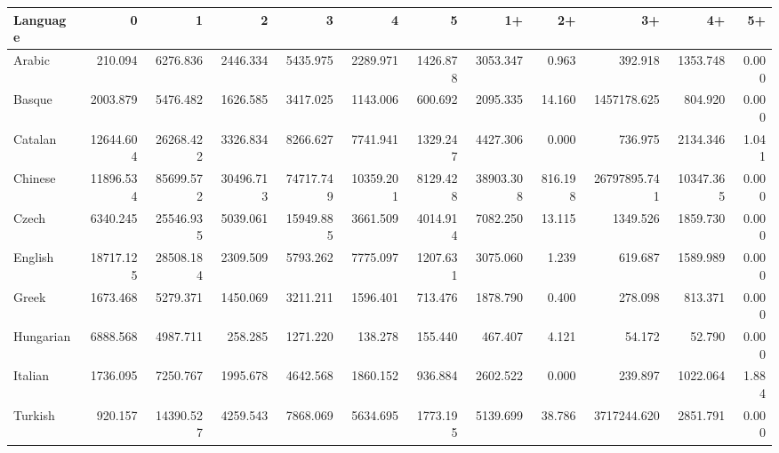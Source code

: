 \begin{tabular}{lrrrrrrrrrrr}
\toprule
 Language   &         0 &         1 &         2 &         3 &         4 &        5 &        1+ &      2+ &           3+ &        4+ &    5+ \\
\midrule
 Arabic     &   210.094 &  6276.836 &  2446.334 &  5435.975 &  2289.971 & 1426.878 &  3053.347 &   0.963 &      392.918 &  1353.748 & 0.000 \\
 Basque     &  2003.879 &  5476.482 &  1626.585 &  3417.025 &  1143.006 &  600.692 &  2095.335 &  14.160 &  1457178.625 &   804.920 & 0.000 \\
 Catalan    & 12644.604 & 26268.422 &  3326.834 &  8266.627 &  7741.941 & 1329.247 &  4427.306 &   0.000 &      736.975 &  2134.346 & 1.041 \\
 Chinese    & 11896.534 & 85699.572 & 30496.713 & 74717.749 & 10359.201 & 8129.428 & 38903.308 & 816.198 & 26797895.741 & 10347.365 & 0.000 \\
 Czech      &  6340.245 & 25546.935 &  5039.061 & 15949.885 &  3661.509 & 4014.914 &  7082.250 &  13.115 &     1349.526 &  1859.730 & 0.000 \\
 English    & 18717.125 & 28508.184 &  2309.509 &  5793.262 &  7775.097 & 1207.631 &  3075.060 &   1.239 &      619.687 &  1589.989 & 0.000 \\
 Greek      &  1673.468 &  5279.371 &  1450.069 &  3211.211 &  1596.401 &  713.476 &  1878.790 &   0.400 &      278.098 &   813.371 & 0.000 \\
 Hungarian  &  6888.568 &  4987.711 &   258.285 &  1271.220 &   138.278 &  155.440 &   467.407 &   4.121 &       54.172 &    52.790 & 0.000 \\
 Italian    &  1736.095 &  7250.767 &  1995.678 &  4642.568 &  1860.152 &  936.884 &  2602.522 &   0.000 &      239.897 &  1022.064 & 1.884 \\
 Turkish    &   920.157 & 14390.527 &  4259.543 &  7868.069 &  5634.695 & 1773.195 &  5139.699 &  38.786 &  3717244.620 &  2851.791 & 0.000 \\
\bottomrule
\end{tabular}